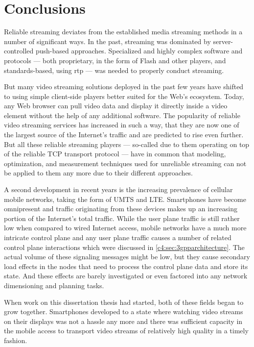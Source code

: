 \chapter{Conclusions}
\label{chap:conclusion}

Reliable streaming deviates from the established media streaming methods in a number of significant ways. In the past, streaming was dominated by server-controlled push-based approaches. Specialized and highly complex software and protocols --- both proprietary, in the form of Flash and other players, and standards-based, using \gls{rtp} --- was needed to properly conduct streaming. 

But many video streaming solutions deployed in the past few years have shifted to using simple client-side players better suited for the Web's ecosystem. Today, any Web browser can pull video data and display it directly inside a video element without the help of any additional software. The popularity of reliable video streaming services has increased in such a way, that they are now one of the largest source of the Internet's traffic and are predicted to rise even further. But all these reliable streaming players --- so-called due to them operating on top of the reliable \gls{TCP} transport protocol --- have in common that modeling, optimization, and measurement techniques used for unreliable streaming can not be applied to them any more due to their different approaches.

A second development in recent years is the increasing prevalence of cellular mobile networks, taking the form of \gls{UMTS} and \gls{LTE}. Smartphones have become omnipresent and traffic originating from these devices makes up an increasing portion of the Internet's total traffic. While the user plane traffic is still rather low when compared to wired Internet access, mobile networks have a much more intricate control plane and any user plane traffic causes a number of related control plane interactions which were discussed in \ref{c4:sec:3gpparchitecture}. The actual volume of these signaling messages might be low, but they cause secondary load effects in the nodes that need to process the control plane data and store its state. And these effects are barely investigated or even factored into any network dimensioning and planning tasks.

When work on this dissertation thesis had started, both of these fields began to grow together. Smartphones developed to a state where watching video streams on their displays was not a hassle any more and there was sufficient capacity in the mobile access to transport video streams of relatively high quality in a timely fashion.

